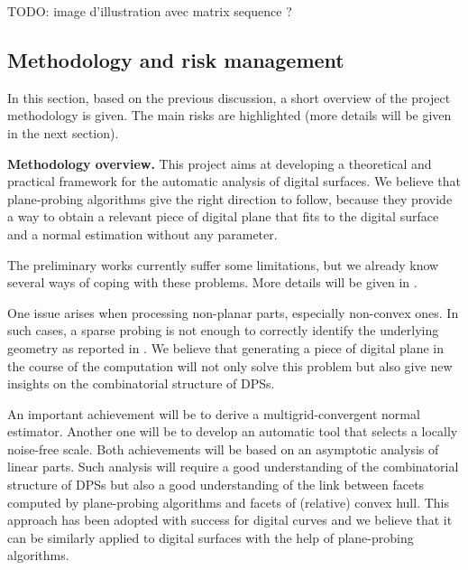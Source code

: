 TODO: image d'illustration avec matrix sequence ?



\subsection{Methodology and risk management}
\label{sec:methodo}


In this section, based on the previous discussion, a short overview of
the project methodology is given. The main risks are highlighted (more
details will be given in the next section).  

\noindent\textbf{Methodology overview.}
This project aims at developing a theoretical and practical framework for the automatic
analysis of digital surfaces. We believe that plane-probing algorithms give the right
direction to follow, because they provide a way to obtain a relevant piece of digital
plane that fits to the digital surface and a normal estimation without any parameter. 

The preliminary works \cite{LPRTCS2016, LPRDGCI2016, LPRJMIV2017}
currently suffer some limitations, but we already know several ways of coping with
these problems. More details will be given in . 

One issue arises when processing non-planar parts, especially non-convex ones.
In such cases, a sparse probing is not enough to correctly identify the underlying geometry
as reported in \cite{LPRJMIV2017}.
We believe that generating a piece of digital plane in the course of the computation will
not only solve this problem but also give new insights on the combinatorial structure
of DPSs.

An important achievement will be to derive a multigrid-convergent normal estimator.
Another one will be to develop an automatic tool that selects a locally noise-free scale.
Both achievements will be based on an asymptotic analysis of linear parts. Such analysis
will require a good understanding of the combinatorial structure of DPSs but also a
good understanding of the link between facets computed by plane-probing algorithms and
facets of (relative) convex hull. This approach has been adopted with success for digital
curves \cite{Lachaud2012} and we believe that it can be similarly applied to digital
surfaces with the help of plane-probing algorithms.
 
